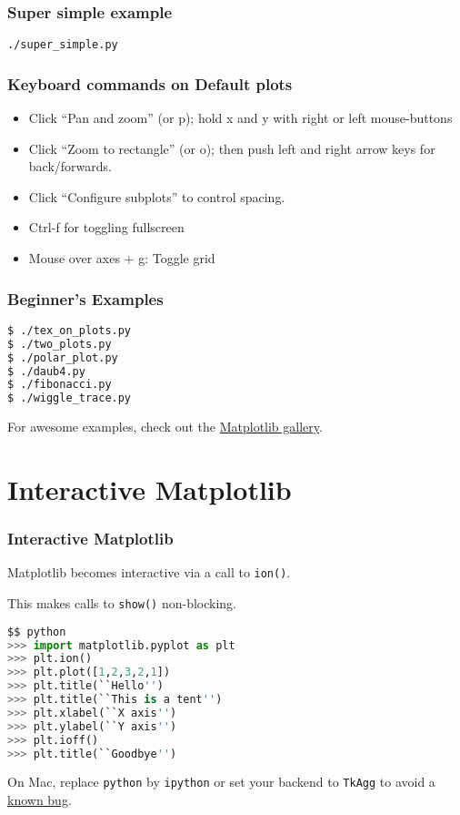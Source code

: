 \documentclass{beamer}
\begin{document}
\begin{frame}
\frametitle{Super simple example}

\texttt{./super\_simple.py}

\end{frame}

\begin{frame}
\frametitle{Keyboard commands on Default plots}

\begin{itemize}

\item Click ``Pan and zoom'' (or p); hold x and y with right or left mouse-buttons
\item Click ``Zoom to rectangle'' (or o); then push left and right arrow keys for back/forwards.
\item Click ``Configure subplots'' to control spacing.
\item Ctrl-f for toggling fullscreen
\item Mouse over axes + g: Toggle grid
\end{itemize}

\end{frame}


\begin{frame}[fragile]
\frametitle{Beginner's Examples}
\begin{lstlisting}[language=bash]
$ ./tex_on_plots.py
$ ./two_plots.py
$ ./polar_plot.py
$ ./daub4.py
$ ./fibonacci.py
$ ./wiggle_trace.py
\end{lstlisting}

\end{frame}

\begin{frame}
For awesome examples, check out the \href{http://matplotlib.org/gallery.html}{Matplotlib gallery}.
\end{frame}

\section{Interactive Matplotlib}
\begin{frame}[fragile]
\frametitle{Interactive Matplotlib}

Matplotlib becomes interactive via a call to \texttt{ion()}.

This makes calls to \texttt{show()} non-blocking.
\begin{lstlisting}[language=Python]
$$ python
>>> import matplotlib.pyplot as plt
>>> plt.ion()
>>> plt.plot([1,2,3,2,1])
>>> plt.title(``Hello'')
>>> plt.title(``This is a tent'')
>>> plt.xlabel(``X axis'')
>>> plt.ylabel(``Y axis'')
>>> plt.ioff()
>>> plt.title(``Goodbye'')
\end{lstlisting}
On Mac, replace \texttt{python} by \texttt{ipython} or set your backend to \texttt{TkAgg} to avoid a \href{http://stackoverflow.com/questions/25960000/interactive-mode-doesnt-switch-on-from-script-matplotlib-1-4-0-python-2-7-5-on}{known bug}.
\end{frame}
\end{document}
